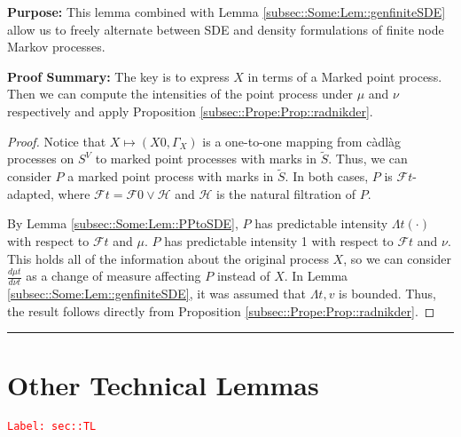 \documentclass[12pt]{article}
\newcommand{\mc}{\mathcal}
\newcommand{\tr}{\textcolor{red}}
\newcommand{\labe}[1]{\tr{\texttt{Label: #1}}}
\newcommand{\purpose}{\textbf{Purpose: }}
\newcommand{\pfsum}{\textbf{Proof Summary: }}
\newcommand{\ind}{\hspace{24pt}}
\newcommand{\lin}{\rule{\linewidth}{0.4 pt}}
\renewcommand{\v}{v}							%
\renewcommand{\S}{S}							%
\renewcommand{\t}{t}							%
\newcommand{\F}{\mc{F}}							%
\newcommand{\FH}[2]{\mc{H}}						%
\newcommand{\X}{X}								%
\newcommand{\alt}[1]{\widetilde{#1}}			%
\newcommand{\m}{\mu}							%
\newcommand{\mm}{\nu}							%
\newcommand{\pmap}[1]{\Gamma_{#1}}				%
\newcommand{\rp}{P}								%
\newcommand{\ratee}{\Lambda}					%
\begin{document}
\purpose This lemma combined with Lemma \ref{subsec::Some:Lem::genfiniteSDE} allow us to freely alternate between SDE and density formulations of finite node Markov processes.

\pfsum The key is to express \(X\) in terms of a Marked point process. Then we can compute the intensities of the point process under \(\mu\) and \(\nu\) respectively and apply Proposition \ref{subsec::Prope:Prop::radnikder}.

\begin{proof}
Notice that \(\X{}{} \mapsto (\X{}{0},\pmap{\X{}{}})\) is a one-to-one mapping from c\`adl\`ag processes on \(\S^ V\) to marked point processes with marks in \(\alt{\S}\). Thus, we can consider \(\rp{}\) a marked point process with marks in \(\alt{\S}\). In both cases, \(\rp{}\) is \(\F{}{\t}\)-adapted, where \(\F{}{\t} = \F{}{0}\vee \FH{}{\t}\) and \(\FH{}{\t}\) is the natural filtration of \(\rp{}\).

\ind By Lemma \ref{subsec::Some:Lem::PPtoSDE}, \(\rp{}\) has predictable intensity \(\ratee{\t}(\cdot)\) with respect to \(\F{}{\t}\) and \(\m{}{}{}\). \(\rp{}\) has predictable intensity 1 with respect to \(\F{}{\t}\) and \(\mm{}{}{}\). This holds all of the information about the original process \(\X{}{}\), so we can consider \(\frac{d\m{}{\t}{}}{d\mm{}{\t}{}}\) as a change of measure affecting \(\rp{}\) instead of \(\X{}{}\). In Lemma \ref{subsec::Some:Lem::genfiniteSDE}, it was assumed that \(\ratee{\t,\v}\) is bounded. Thus, the result follows directly from Proposition \ref{subsec::Prope:Prop::radnikder}. 
\end{proof}

\lin
\section{Other Technical Lemmas}
\label{sec::TL}\labe{sec::TL}
\end{document}
